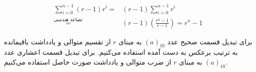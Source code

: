 \documentclass[a5paper]{article}
\begin{document}
\begin{equation}\begin{split}
  \sum_{i=0}^{n-1}(r-1)r^{i} = &(r-1)\sum_{i=0}^{n-1}r^{i}\\
  \stackrel{\text{تصاعد هندسی}}{=} &(r-1)(\frac{r^{n}-1}{r-1}) = r^{n} -1
\end{split}\end{equation}

برای تبدیل قسمت صحیح عدد $(a)_{10}$ به مبنای $r$ از تقسیم متوالی و یادداشت باقیمانده به ترتیب برعکس به دست آمده استفاده می‌کنیم.
برای تبدیل قسمت اعشاری عدد $(a)_{10}$ به مبنای $r$ از ضرب متوالی و یادداشت صورت حاصل استفاده می‌کنیم.







\end{document}
